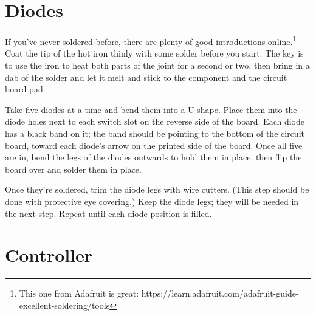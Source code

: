 \documentclass{article}
\begin{document}
\section{Diodes}

If you've never soldered before, there are plenty of good
introductions online.\footnote{This one from Adafruit is great:
  https://learn.adafruit.com/adafruit-guide-excellent-soldering/tools}
Coat the tip of the hot iron thinly with some solder before you
start. The key is to use the iron to heat both parts of the joint for
a second or two, then bring in a dab of the solder and let it melt and
stick to the component and the circuit board pad.

\vspace{1em}

Take five diodes at a time and bend them into a U shape. Place them
into the diode holes next to each switch slot on the reverse side of
the board. Each diode has a black band on it; the band should be
pointing to the bottom of the circuit board, toward each diode's arrow
on the printed side of the board. Once all five are in, bend the legs
of the diodes outwards to hold them in place, then flip the board over
and solder them in place.

\vspace{1em}
\noindent{}
\vspace{1em}

Once they're soldered, trim the diode legs with wire cutters. (This
step should be done with protective eye covering.) Keep the diode
legs; they will be needed in the next step. Repeat until each diode
position is filled.

\section{Controller}
\end{document}
